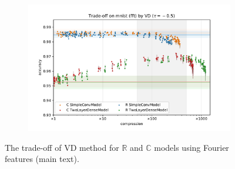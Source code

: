 \documentclass[a4paper,10pt,onecolumn]{article}
\newcommand{\real}{\mathbb{R}}
\newcommand{\cplx}{\mathbb{C}}
\begin{document}
\begin{figure}[b]
\begin{subfigure}[b]{0.5\columnwidth}
  \end{subfigure}%
  \begin{subfigure}[b]{0.5\columnwidth}
    \centering
    \includegraphics[width=\linewidth]{figure__mnist-like__trade-off/legacy__VD__mnist__fft__-0.5.pdf}
  \end{subfigure}
  \caption{%
    The trade-off of VD method for $\real$ and $\cplx$ models using Fourier features (main text).
  }
  \label{fig:paper__mnist-like__trade-off__VD__fft}
\end{figure}
\end{document}
